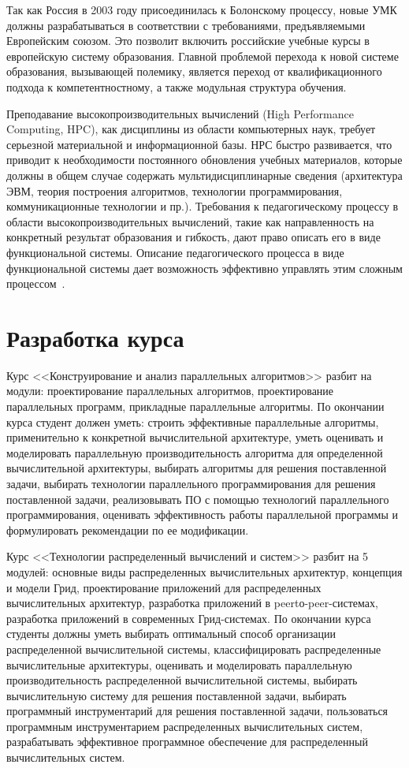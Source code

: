 \documentclass[a4paper,11pt,draft]{article} %
\begin{document}
	Так как Россия в 2003 году присоединилась к Болонскому процессу, новые УМК должны разрабатываться в соответствии с требованиями, предъявляемыми Европейским союзом. Это позволит включить российские учебные курсы в европейскую систему образования. Главной проблемой
	перехода к новой системе образования, вызывающей полемику, является переход от квалификационного подхода к компетентностному, а также модульная структура обучения.
	
	Преподавание высокопроизводительных вычислений (High Performance Computing, HPC), как
	дисциплины из области компьютерных наук, требует серьезной материальной и информационной
	базы. НРС быстро развивается, что приводит к необходимости постоянного обновления учебных
	материалов, которые должны в общем случае содержать мультидисциплинарные сведения (архитектура ЭВМ, теория построения алгоритмов, технологии программирования, коммуникационные технологии и пр.). Требования к педагогическому процессу в области высокопроизводительных вычислений, такие как направленность на конкретный результат образования и гибкость,
	дают право описать его в виде функциональной системы. Описание педагогического процесса в
	виде функциональной системы дает возможность эффективно управлять этим сложным процессом~\cite{3}.
	
	\section{Разработка курса}
	Курс <<Конструирование и анализ параллельных алгоритмов>> разбит на модули: проектирование
	параллельных алгоритмов, проектирование параллельных программ, прикладные параллельные
	алгоритмы. По окончании курса студент должен уметь: строить эффективные параллельные 
	алгоритмы, применительно к конкретной вычислительной архитектуре, уметь оценивать и моделировать параллельную производительность алгоритма для определенной вычислительной архитектуры, выбирать алгоритмы для решения поставленной задачи, выбирать технологии параллельного программирования для решения поставленной задачи, реализовывать ПО с помощью
	технологий параллельного программирования, оценивать эффективность работы параллельной
	программы и формулировать рекомендации по ее модификации.
	
	Курс <<Технологии распределенный вычислений и систем>> разбит на 5 модулей: основные виды распределенных вычислительных архитектур, концепция и модели Грид, проектирование приложений для распределенных вычислительных архитектур, разработка приложений в peertо-peer-системах, разработка приложений в современных Грид-системах. По окончании курса студенты должны уметь выбирать оптимальный способ организации распределенной вычислительной системы, классифицировать распределенные вычислительные архитектуры, оценивать и моделировать параллельную производительность распределенной вычислительной системы, выбирать вычислительную систему для решения поставленной задачи, выбирать программный инструментарий для решения поставленной задачи, пользоваться программным инструментарием распределенных вычислительных систем, разрабатывать эффективное программное обеспечение для распределенный вычислительных систем.
	
\end{document}
